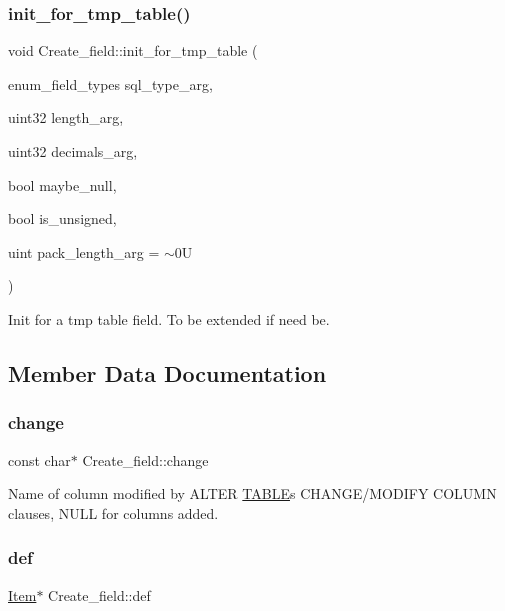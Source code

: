 \subsubsection{\texorpdfstring{init\+\_\+for\+\_\+tmp\+\_\+table()}{init\_for\_tmp\_table()}}
{\footnotesize\ttfamily void Create\+\_\+field\+::init\+\_\+for\+\_\+tmp\+\_\+table (\begin{DoxyParamCaption}\item[{enum\+\_\+field\+\_\+types}]{sql\+\_\+type\+\_\+arg,  }\item[{uint32}]{length\+\_\+arg,  }\item[{uint32}]{decimals\+\_\+arg,  }\item[{bool}]{maybe\+\_\+null,  }\item[{bool}]{is\+\_\+unsigned,  }\item[{uint}]{pack\+\_\+length\+\_\+arg = {\ttfamily $\sim$0U} }\end{DoxyParamCaption})}

Init for a tmp table field. To be extended if need be. 

\subsection{Member Data Documentation}
\mbox{\label{classCreate__field_a03e21b16d55606529d6a56b7639acb0f}} 
\subsubsection{\texorpdfstring{change}{change}}
{\footnotesize\ttfamily const char$\ast$ Create\+\_\+field\+::change}

Name of column modified by A\+L\+T\+ER \mbox{\hyperlink{structTABLE}{T\+A\+B\+LE}}\textquotesingle{}s C\+H\+A\+N\+G\+E/\+M\+O\+D\+I\+FY C\+O\+L\+U\+MN clauses, N\+U\+LL for columns added. \mbox{\label{classCreate__field_add6934550bcdc4bd48101899066afcf7}} 
\subsubsection{\texorpdfstring{def}{def}}
{\footnotesize\ttfamily \mbox{\hyperlink{classItem}{Item}}$\ast$ Create\+\_\+field\+::def}

